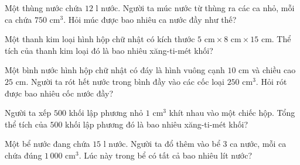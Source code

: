 \begin{ex} %
Một thùng nước chứa $12\text{ l}$ nước. Người ta múc nước từ thùng ra các ca nhỏ, mỗi ca chứa $750\text{ cm}^3$. Hỏi múc được bao nhiêu ca nước đầy như thế?
\end{ex}

\begin{ex} %
Một thanh kim loại hình hộp chữ nhật có kích thước $5\text{ cm} \times 8\text{ cm} \times 15\text{ cm}$. Thể tích của thanh kim loại đó là bao nhiêu xăng-ti-mét khối?
\end{ex}

\begin{ex} %
Một bình nước hình hộp chữ nhật có đáy là hình vuông cạnh $10\text{ cm}$ và chiều cao $25\text{ cm}$. Người ta rót hết nước trong bình đầy vào các cốc loại $250\text{ cm}^3$. Hỏi rót được bao nhiêu cốc nước đầy?
\end{ex}

\begin{ex} %
Người ta xếp $500$ khối lập phương nhỏ $1\text{ cm}^3$ khít nhau vào một chiếc hộp. Tổng thể tích của $500$ khối lập phương đó là bao nhiêu xăng-ti-mét khối?
\end{ex}

\begin{ex} %
Một bể nước đang chứa $15\text{ l}$ nước. Người ta đổ thêm vào bể 3 ca nước, mỗi ca chứa đúng $1\,000\text{ cm}^3$. Lúc này trong bể có tất cả bao nhiêu lít nước?
\end{ex}
